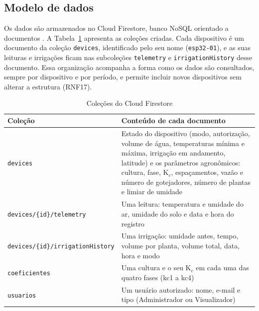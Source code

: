 \subsection{Modelo de dados}
\label{subsec:modelo-dados}

Os dados são armazenados no Cloud Firestore, banco NoSQL orientado a documentos \cite{firestore2026}. A Tabela~\ref{tab:colecoes} apresenta as coleções criadas. Cada dispositivo é um documento da coleção \texttt{devices}, identificado pelo seu nome (\texttt{esp32-01}), e as suas leituras e irrigações ficam nas subcoleções \texttt{telemetry} e \texttt{irrigationHistory} desse documento. Essa organização acompanha a forma como os dados são consultados, sempre por dispositivo e por período, e permite incluir novos dispositivos sem alterar a estrutura (RNF17).

\begin{table}[!htbp]
  \centering
  \caption{Coleções do Cloud Firestore}
  \label{tab:colecoes}
  \small
  \renewcommand{\arraystretch}{1.2}
  \begin{tabularx}{\textwidth}{>{\raggedright\arraybackslash}p{6.3cm}
                               >{\raggedright\arraybackslash}X}
    \hline
    \textbf{Coleção} & \textbf{Conteúdo de cada documento} \\
    \hline
    \texttt{devices} & Estado do dispositivo (modo, autorização, volume de água, temperaturas mínima e máxima, irrigação em andamento, latitude) e os parâmetros agronômicos: cultura, fase, K$_c$, espaçamentos, vazão e número de gotejadores, número de plantas e limiar de umidade \\
    \texttt{devices/\{id\}/telemetry} & Uma leitura: temperatura e umidade do ar, umidade do solo e data e hora do registro \\
    \texttt{devices/\{id\}/irrigationHistory} & Uma irrigação: umidade antes, tempo, volume por planta, volume total, data, hora e modo \\
    \texttt{coeficientes} & Uma cultura e o seu K$_c$ em cada uma das quatro fases (kc1 a kc4) \\
    \texttt{usuarios} & Um usuário autorizado: nome, e-mail e tipo (Administrador ou Visualizador) \\
    \hline
  \end{tabularx}
\end{table}

